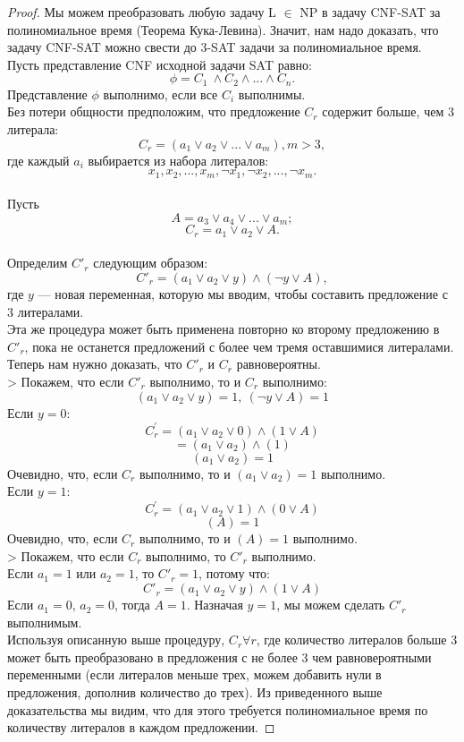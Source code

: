     \begin{proof}
        Мы можем преобразовать любую задачу L $\in$ NP в задачу CNF-SAT за полиномиальное время (Теорема Кука-Левина). Значит, нам надо доказать, что задачу CNF-SAT можно свести до 3-SAT задачи за полиномиальное время.\\
        Пусть представление CNF исходной задачи SAT равно:
        $$\phi = C_1 \ \wedge C_2 \wedge ... \wedge C_n.$$ Представление $\phi$ выполнимо, если все $C_i$ выполнимы.\\
        Без потери общности предположим, что предложение $C_r$ содержит больше, чем 3 литерала:
        $$C_r = (a_1 \vee a_2 \vee ... \vee a_m), m>3,$$ где каждый $a_i$ выбирается из набора литералов:  $$x_1, x_2, ...,x_m, \neg x_1, \neg x_2, ..., \neg x_m.$$\\
        Пусть $$A = a_3 \vee a_4 \vee ... \vee a_m;$$
        $$C_r = a_1 \vee a_2 \vee A.$$\\
        Определим $C'_r$ следующим образом:
        $$C'_r = (a_1 \vee a_2 \vee y) \wedge (\neg y \vee A),$$ где $y$ --- новая переменная, которую мы вводим, чтобы составить предложение с 3 литералами.\\
        Эта же процедура может быть применена повторно ко второму предложению в $C'_r$, пока не останется предложений с более чем тремя оставшимися литералами.\\
        Теперь нам нужно доказать, что $C'_r$ и $C_r$ равновероятны.\\
        > Покажем, что если $C'_r$ выполнимо, то и $C_r$ выполнимо:
        $$(a_1 \vee a_2 \vee y)=1,\ (\neg y \vee A) = 1$$
        Если $y = 0$:
        $$C_r^\prime = (a_1 \vee a_2 \vee 0) \wedge (1 \vee A)$$
        $$ = (a_1 \vee a_2) \wedge (1) $$
        $$(a_1 \vee a_2) = 1$$
        Очевидно, что, если $C_r$ выполнимо, то и $(a_1 \vee a_2) = 1$ выполнимо.\\
        Если $y=1$:
        $$C_r^\prime = (a_1 \vee a_2 \vee 1) \wedge (0 \vee A)$$
        $$(A) = 1$$
        Очевидно, что, если $C_r$ выполнимо, то и $(A) = 1$ выполнимо.\\
        > Покажем, что если $C_r$ выполнимо, то $C'_r$ выполнимо.\\
        Если $a_1 = 1$ или $a_2 = 1$, то $C'_r = 1$, потому что:
        $$C'_r = (a_1 \vee a_2 \vee y) \wedge (1 \vee A) $$
        Если $a_1 = 0$, $a_2 = 0$, тогда $A = 1$. Назначая $y = 1$, мы можем сделать $C'_r$ выполнимым.\\
        Используя описанную выше процедуру, $C_r \forall r$, где количество литералов больше 3 может быть преобразовано в предложения с не более 3 чем равновероятными переменными (если литералов меньше трех, можем добавить нули в предложения, дополнив количество до трех). Из приведенного выше доказательства мы видим, что для этого требуется полиномиальное время по количеству литералов в каждом предложении.
    \end{proof}
